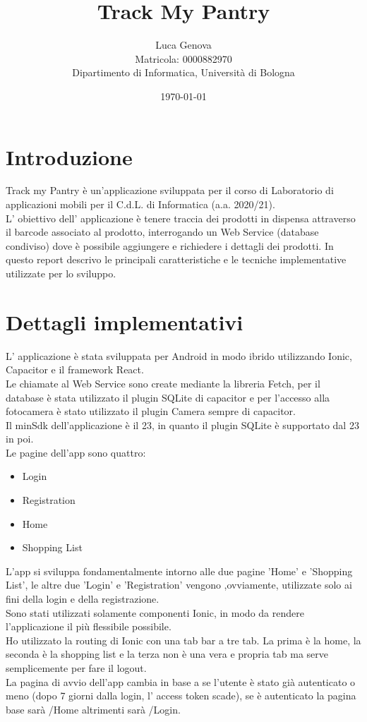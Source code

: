 \documentclass[11pt]{article}
\title{Track My Pantry}
\author{Luca Genova \\ Matricola: 0000882970 \\ Dipartimento di Informatica, Università di Bologna}
\date{\today}
\begin{document}
\maketitle

\null
\null
\null
\null
\section*{Introduzione}
Track my Pantry è un'applicazione sviluppata per il corso di Laboratorio di applicazioni mobili per il C.d.L. di Informatica (a.a. 2020/21).\\
L' obiettivo dell' applicazione è tenere traccia dei prodotti in dispensa attraverso il barcode associato al prodotto, interrogando un Web Service (database condiviso) dove è possibile aggiungere e richiedere i dettagli dei prodotti. In questo report descrivo le principali caratteristiche e le tecniche implementative utilizzate per lo sviluppo.

\newpage
\tableofcontents
\newpage

\section{Dettagli implementativi}
L' applicazione è stata sviluppata per Android in modo ibrido utilizzando Ionic, Capacitor e il framework React. \\
Le chiamate al Web Service sono create mediante la libreria Fetch, per il database è stata utilizzato il plugin SQLite di capacitor e per l'accesso alla fotocamera è stato utilizzato il plugin Camera sempre di capacitor.\\
Il minSdk dell'applicazione è il 23, in quanto il plugin SQLite è supportato dal 23 in poi.\\
Le pagine dell'app sono quattro:
\begin{itemize}
\item Login
\item Registration
\item Home
\item Shopping List
\end{itemize}

L'app si sviluppa fondamentalmente intorno alle due pagine 'Home' e 'Shopping List', le altre due 'Login' e 'Registration' vengono ,ovviamente, utilizzate solo ai fini della login e della registrazione.\\
Sono stati utilizzati solamente componenti Ionic, in modo da rendere l'applicazione il più flessibile possibile.\\
Ho utilizzato la routing di Ionic con una tab bar a tre tab. La prima è la home, la seconda è la shopping list e la terza non è una vera e propria tab ma serve semplicemente per fare il logout.\\
 La pagina di avvio dell'app cambia in base a se l'utente è stato già autenticato o meno (dopo 7 giorni dalla login, l' access token scade), se è autenticato la pagina base sarà /Home altrimenti sarà /Login. \\
\end{document}
